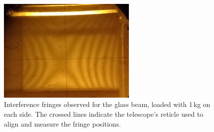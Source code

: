 \documentclass[a4paper,11pt]{article}
\begin{document}
\begin{figure}[H]
  \centering
  \includegraphics[width=0.6\textwidth]{1.jpg}
  \caption{Interference fringes observed for the glass beam, loaded with 1\,kg on each side. 
  The crossed lines indicate the telescope's reticle used to align and measure the fringe positions.}
  \label{fig:fringes_1kg}
\end{figure}
\end{document}
